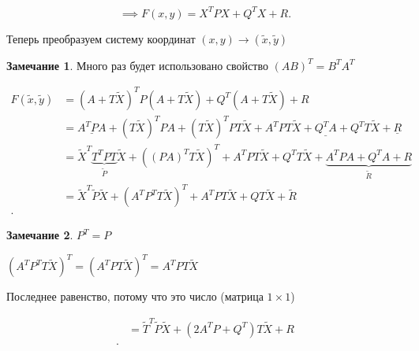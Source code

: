 \documentclass{book}
\newcommand{\tl}[1]{\widetilde{#1}}
\theoremstyle{definition}
\newtheorem*{note}{Замечание}
\begin{document}
\[
    \implies F(x,y) = X^TPX+Q^TX+R
.\] 

Теперь преобразуем систему координат $(x,y) \to (\tl x, \tl y)$

\begin{note}
    Много раз будет использовано свойство $(AB)^T =  B^TA^T$
\end{note}

\begin{align*}
    F(\tl x, \tl y) & = (A+T\tl X)^TP(A+T\tl X) + Q^T(A + T\tl X)+R\\
                    &= \underline{A^TPA} + (T\tl X)^TPA + (T\tl X)^TPT\tl X + A^TPT\tl X + \underline{Q^TA} + Q^TT\tl X+\underline{R} \\
                    &= \tl X^T\underbrace{T^TPT}\limits_{\tl P}\tl X + ((PA)^TT\tl X)^T + A^TPT\tl X+Q^TT\tl X + \underbrace{A^TPA + Q^TA + R}\limits_{\tl R}\\
                    &= \tl X^T \tl P\tl X + (A^TP^TT\tl X)^T + A^TPT\tl X + QT\tl X + \tl R\\
.\end{align*}
\begin{note}
    $P^T = P$

    $(A^TP^TT\tl X)^T = (A^TPT\tl X)^T = A^TPT\tl X$

    Последнее равенство, потому что это число (матрица $1\times 1$)
\end{note}
\begin{align*}
    &= \tl T^T \tl P\tl X + (2A^T P + Q^T)T\tl X + R \\
.\end{align*}
\end{document}
